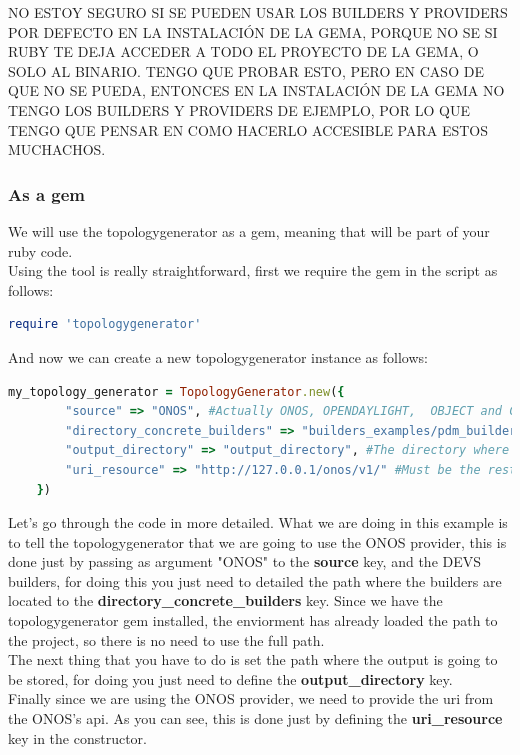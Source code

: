NO ESTOY SEGURO SI SE PUEDEN USAR LOS BUILDERS Y PROVIDERS POR DEFECTO EN LA INSTALACIÓN DE LA GEMA, PORQUE NO SE SI RUBY TE DEJA ACCEDER A TODO EL PROYECTO DE LA GEMA, O SOLO AL BINARIO. TENGO QUE PROBAR ESTO, PERO EN CASO DE QUE NO SE PUEDA, ENTONCES EN LA INSTALACIÓN DE LA GEMA NO TENGO LOS BUILDERS Y PROVIDERS DE EJEMPLO, POR LO QUE TENGO QUE PENSAR EN COMO HACERLO ACCESIBLE PARA ESTOS MUCHACHOS.

\subsubsection{As a gem}

We will use the topologygenerator as a gem, meaning that will be part of your ruby code. \\
Using the tool is really straightforward, first we require the gem in the script as follows:

\begin{lstlisting}[language=Ruby,breaklines=true]
require 'topologygenerator'
\end{lstlisting}

And now we can create a new topologygenerator instance as follows:

\begin{lstlisting}[language=Ruby,breaklines=true]
my_topology_generator = TopologyGenerator.new({
        "source" => "ONOS", #Actually ONOS, OPENDAYLIGHT,  OBJECT and CUSTOM are the options supported
        "directory_concrete_builders" => "builders_examples/pdm_builders", #The directory where builders are located
        "output_directory" => "output_directory", #The directory where the output will be saved
        "uri_resource" => "http://127.0.0.1/onos/v1/" #Must be the rest api uri if either ONOS or OpenDayLight is choosed or the path of a file if CUSTOM is choosed. In case OBJECT is choosed, you will have to provide a valid instance of Topology.
    })
\end{lstlisting}

Let's go through the code in more detailed. What we are doing in this example is to tell the topologygenerator that we are going to use the ONOS provider, this is done just by passing as argument "ONOS" to the \textbf{source} key, and the DEVS builders, for doing this you just need to detailed the path where the builders are located to the \textbf{directory\_concrete\_builders} key. Since we have the topologygenerator gem installed, the enviorment has already loaded the path to the project, so there is no need to use the full path.\\
The next thing that you have to do is set the path where the output is going to be stored, for doing you just need to define the \textbf{output\_directory} key.\\
Finally since we are using the ONOS provider, we need to provide the uri from the ONOS's api. As you can see, this is done just by defining the \textbf{uri\_resource} key in the constructor. \\

